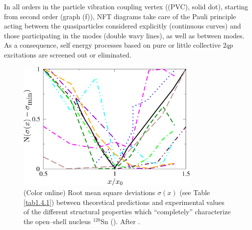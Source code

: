 In all orders in the particle vibration coupling vertex ((PVC), solid dot), starting from second order (graph (f)), NFT diagrams take care of the  Pauli principle acting between the quasiparticles considered explicitly (continuous curves) and those participating in the modes (double wavy lines), as well as between modes. As a consequence, self energy processes based on pure or  little collective $2qp$ excitations are  screened out or eliminated.

\begin{figure}
\begin{center}
\includegraphics[width=0.8\textwidth]{introduccion/figs/funnel_norm_tot_try.pdf}
\caption{(Color online)
Root mean square deviations $\sigma(x)$ (see Table \ref{tab1.4.1}) between theoretical predictions and experimental values of the different structural properties which ``completely'' characterize the open--shell nucleus $^{120}$Sn (\cite{Idini:15}). After \cite{Broglia:16}.}\label{fig1.4.1x}
\end{center}
\end{figure}



